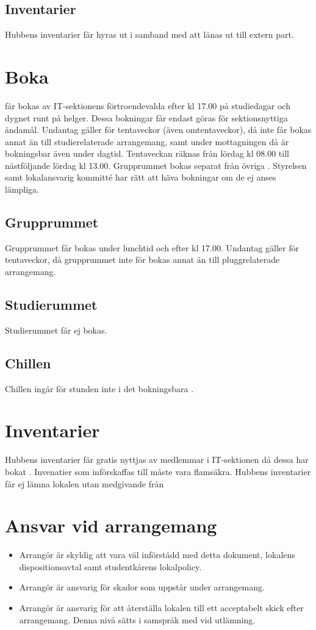 \documentclass[11pt, includeaddress]{../../classes/cthit}
\begin{document}
\subsection{Inventarier}
Hubbens inventarier får hyras ut i samband med att \HUBBEN lånas ut till extern part.


\section{Boka}
\HUBBEN får bokas av IT-­sektionens förtroendevalda efter kl 17.00 på studiedagar och dygnet runt på helger. Dessa bokningar får endast göras för sektionsnyttiga ändamål. Undantag gäller för tentaveckor (även omtentaveckor), då \HUBBEN inte får bokas annat än till studierelaterade arrangemang, samt under mottagningen då \HUBBEN är bokningsbar även under dagtid. Tentaveckan räknas från lördag kl 08.00 till nästföljande lördag kl 13.00. Grupprummet bokas separat från övriga \HUBBEN. Styrelsen samt lokalansvarig kommitté har rätt att häva bokningar om de ej anses lämpliga. 

\subsection{Grupprummet}
Grupprummet får bokas under lunchtid och efter kl 17.00. Undantag gäller för tentaveckor, då grupprummet inte för bokas annat än till pluggrelaterade arrangemang.

\subsection{Studierummet}
Studierummet får ej bokas.

\subsection{Chillen}
Chillen ingår för stunden inte i det bokningsbara \HUBBEN. 


\section{Inventarier}
Hubbens inventarier får gratis nyttjas av medlemmar i IT­-sektionen då dessa har bokat \HUBBEN. Invenatier som införskaffas till \HUBBEN måste vara flamsäkra. Hubbens inventarier får ej lämna lokalen utan medgivande från \PRIT 

\section{Ansvar vid arrangemang}
\begin{itemize}
	\item Arrangör är skyldig att vara väl införstådd med detta dokument, lokalens dispositionsavtal samt studentkårens lokalpolicy. 
	\item Arrangör är ansvarig för skador som uppstår under arrangemang. 
	\item Arrangör är ansvarig för att återställa lokalen till ett acceptabelt skick efter arrangemang. Denna nivå sätts i samspråk med \PRIT vid utlämning.
\end{itemize}
\end{document}
